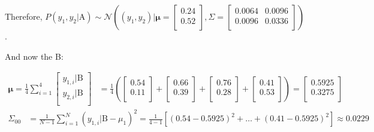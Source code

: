 \documentclass[12pt]{article}
\begin{document}
\begin{enumerate}[leftmargin=\labelsep]
\begin{enumerate}
          Therefore, $P(y_1, y_2|\text{A}) \sim \mathcal{N}\left((y_1, y_2) | \boldsymbol{\mu} = \begin{bmatrix}0.24 \\0.52 \\\end{bmatrix},
              \Sigma = \begin{bmatrix}0.0064 & 0.0096 \\0.0096 & 0.0336 \\\end{bmatrix}\right)$.

          And now the B:

          $$
              \begin{aligned}
                  \boldsymbol{\mu} = \frac{1}{4} \sum^{4}_{i=1} \begin{bmatrix}y_{1,i} | \text{B} \\y_{2,i} | \text{B} \\\end{bmatrix} & =
                      \frac{1}{4}
                      \left(\begin{bmatrix}0.54 \\0.11 \\\end{bmatrix} +
                      \begin{bmatrix}0.66 \\0.39 \\\end{bmatrix} +
                      \begin{bmatrix}0.76 \\0.28 \\\end{bmatrix} +
                      \begin{bmatrix}0.41 \\0.53 \\\end{bmatrix}\right)
                      = \begin{bmatrix}0.5925 \\0.3275 \\\end{bmatrix}
              \end{aligned}
          $$
          $$
              \begin{aligned}
                  \Sigma_{00} & = \frac{1}{N-1} \sum^{N}_{i=1} (y_{1,i} | \text{B} - \mu_{1})^2 = \frac{1}{4-1} \left[(0.54-0.5925)^2 + \dots + (0.41-0.5925)^2\right] \approx 0.0229 \\

\end{aligned}$$
\end{enumerate}
\end{enumerate}
\end{document}
